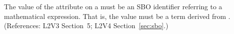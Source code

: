 The value of the  attribute on a \Trigger must be an SBO
identifier referring to a mathematical expression.  That is, the value
must be a term derived from \sbomathformula.  (References: 
L2V3 Section~5; L2V4 Section~\ref{sec:sbo}.)
